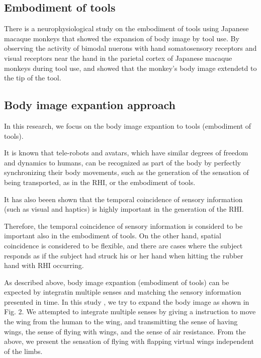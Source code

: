 \documentclass[letterpaper, 10 pt, conference]{ieeeconf}  %
\begin{document}
        \subsection{Embodiment of tools}
                There is a neurophysiological study on the embodiment of tools using Japanese macaque monkeys that showed the expansion of body image by tool use.  
                By observing the activity of bimodal nuerons with hand somatosensory receptors and visual receptors near the hand in the parietal cortex of Japanese macaque monkeys during tool use, and showed that the monkey's body image extendetd to the tip of the tool\cite{iriki1996coding}.
                

        \subsection{Body image expantion approach}
                In this research, we focus on the body image expantion to tools (embodiment of tools).

                It is known that tele-robots and avatars, which have similar degrees of freedom and dynamics to humans, can be recognized as part of the body by perfectly synchronizing their body movements, such as the generation of the sensation of being transported, as in the RHI, or the embodiment of tools.
                
                It has also beeen shown that the temporal coincidence of sensory information (such as visual and haptics) is highly important in the generation of the RHI\cite{ehrsson2007experimental}.  
                
                Therefore, the temporal coincidence of sensory information is considerd to be important also in the embodiment of tools.  
                On the other hand, spatial coincidence is considered to be flexible, and there are cases where the subject responds as if the subject had struck his or her hand when hitting the rubber hand with RHI occurring\cite{armel2003projecting}.  


                As described above, body image expantion (embodiment of tools) can be expected by integratin multiple senses and matching the sensory information presented in time.  
                In this study , we try to expand the body image as shown in Fig. 2.  
                We attempted to integrate multiple senses by giving a instruction to move the wing from the human to the wing, and transmitting the sense of having wings, the sense of flying with wings, and the sense of air resistance.  
                From the above, we present the sensation of flying with flapping virtual wings independent of the limbs.
\end{document}
